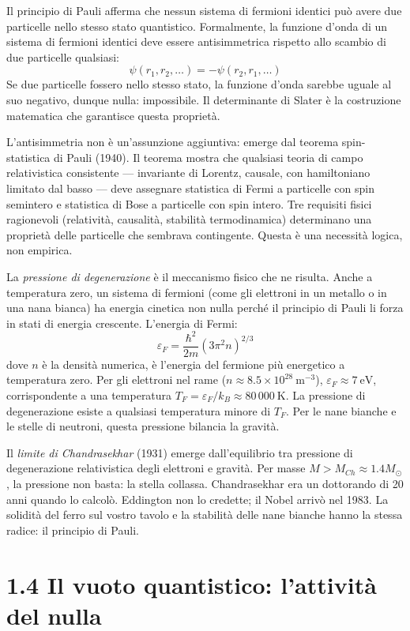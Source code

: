 \documentclass[11.5pt,a4paper,openany]{book}
\theoremstyle{remark}
\begin{document}
Il principio di Pauli afferma che nessun sistema di fermioni identici può avere due particelle nello stesso stato quantistico. Formalmente, la funzione d'onda di un sistema di fermioni identici deve essere antisimmetrica rispetto allo scambio di due particelle qualsiasi:
\[
\psi(r_1, r_2, \ldots) = -\psi(r_2, r_1, \ldots)
\]
Se due particelle fossero nello stesso stato, la funzione d'onda sarebbe uguale al suo negativo, dunque nulla: impossibile. Il determinante di Slater è la costruzione matematica che garantisce questa proprietà.

L'antisimmetria non è un'assunzione aggiuntiva: emerge dal teorema spin-statistica di Pauli (1940). Il teorema mostra che qualsiasi teoria di campo relativistica consistente --- invariante di Lorentz, causale, con hamiltoniano limitato dal basso --- deve assegnare statistica di Fermi a particelle con spin semintero e statistica di Bose a particelle con spin intero. Tre requisiti fisici ragionevoli (relatività, causalità, stabilità termodinamica) determinano una proprietà delle particelle che sembrava contingente. Questa è una necessità logica, non empirica.

La \textit{pressione di degenerazione} è il meccanismo fisico che ne risulta. Anche a temperatura zero, un sistema di fermioni (come gli elettroni in un metallo o in una nana bianca) ha energia cinetica non nulla perché il principio di Pauli li forza in stati di energia crescente. L'energia di Fermi:
\[
\varepsilon_F = \frac{\hbar^2}{2m}\left(3\pi^2 n\right)^{2/3}
\]
dove $n$ è la densità numerica, è l'energia del fermione più energetico a temperatura zero. Per gli elettroni nel rame ($n \approx 8.5 \times 10^{28}\ \text{m}^{-3}$), $\varepsilon_F \approx 7\ \text{eV}$, corrispondente a una temperatura $T_F = \varepsilon_F/k_B \approx 80\,000\ \text{K}$. La pressione di degenerazione esiste a qualsiasi temperatura minore di $T_F$. Per le nane bianche e le stelle di neutroni, questa pressione bilancia la gravità.

Il \textit{limite di Chandrasekhar} (1931) emerge dall'equilibrio tra pressione di degenerazione relativistica degli elettroni e gravità. Per masse $M > M_{Ch} \approx 1.4 M_\odot$, la pressione non basta: la stella collassa. Chandrasekhar era un dottorando di 20 anni quando lo calcolò. Eddington non lo credette; il Nobel arrivò nel 1983. La solidità del ferro sul vostro tavolo e la stabilità delle nane bianche hanno la stessa radice: il principio di Pauli.

\section{1.4 Il vuoto quantistico: l'attività del nulla}
\end{document}
